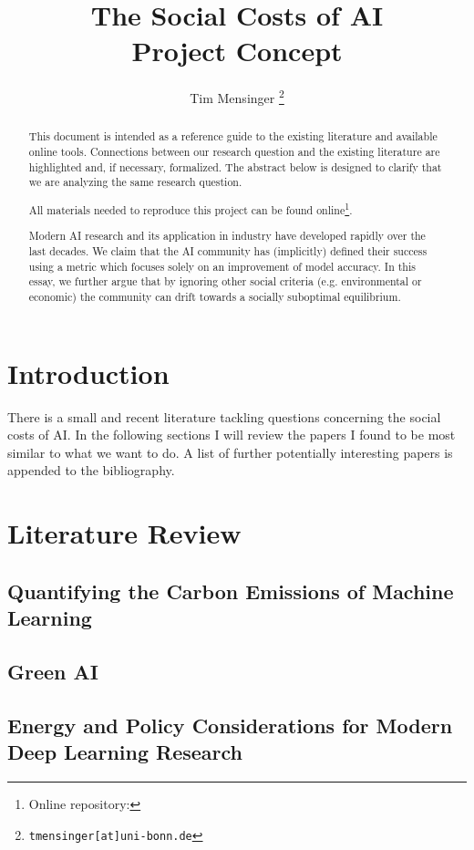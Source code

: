 \documentclass[a4paper, 12pt]{article}
\title{\textbf{The Social Costs of AI}\\
    \Large Project Concept
}
\date{}
\author{Tim Mensinger%
  \thanks{\texttt{tmensinger[at]uni-bonn.de}}
}
\affil{Bonn Graduate School of Economics}
\begin{document}
\onehalfspacing


\maketitle

\renewcommand{\abstractname}{Preamble}
\begin{abstract}
    \noindent This document is intended as a reference guide to the existing literature
    and available online tools. Connections between our research question and the
    existing literature are highlighted and, if necessary, formalized. The abstract
    below is designed to clarify that we are analyzing the same research question.

    All materials needed to reproduce this project can be found online\footnote{Online
    repository: }.
\end{abstract}

\renewcommand{\abstractname}{Abstract}
\begin{abstract}
    \noindent Modern AI research and its application in industry have developed rapidly
    over the last decades. We claim that the AI community has (implicitly) defined their
    success using a metric which focuses solely on an improvement of model accuracy. In
    this essay, we further argue that by ignoring other social criteria (e.g.
    environmental or economic) the community can drift towards a socially suboptimal
    equilibrium.
\end{abstract}
\thispagestyle{empty}

\newpage



\section{Introduction}

There is a small and recent literature tackling questions concerning the social costs of
AI. In the following sections I will review the papers I found to be most similar to
what we want to do. A list of further potentially interesting papers is appended to the
bibliography.


\section{Literature Review}

\subsection{Quantifying the Carbon Emissions of Machine Learning}

\subsection{Green AI}

\subsection{Energy and Policy Considerations for Modern Deep Learning Research}


\nocite{*}
\printbibliography[heading=bibintoc, title={Bibliography}]
\end{document}
